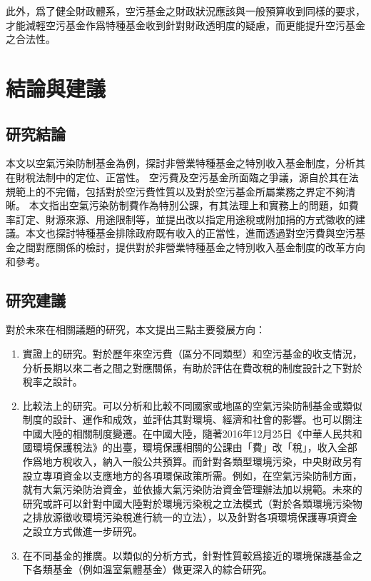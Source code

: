 \documentclass[12pt,a4paper]{article}
\begin{document}
此外，爲了健全財政體系，空污基金之財政狀況應該與一般預算收到同樣的要求，才能減輕空污基金作爲特種基金收到針對財政透明度的疑慮，而更能提升空污基金之合法性。

\section{結論與建議}

\subsection{研究結論}

本文以空氣污染防制基金為例，探討非營業特種基金之特別收入基金制度，分析其在財稅法制中的定位、正當性。
空污費及空污基金所面臨之爭議，源自於其在法規範上的不完備，包括對於空污費性質以及對於空污基金所屬業務之界定不夠清晰。
本文指出空氣污染防制費作為特別公課，有其法理上和實務上的問題，如費率訂定、財源來源、用途限制等，並提出改以指定用途稅或附加捐的方式徵收的建議。本文也探討特種基金排除政府既有收入的正當性，進而透過對空污費與空污基金之間對應關係的檢討，提供對於非營業特種基金之特別收入基金制度的改革方向和參考。



\subsection{研究建議}

對於未來在相關議題的研究，本文提出三點主要發展方向：
\begin{enumerate}
  \item 實證上的研究。對於歷年來空污費（區分不同類型）和空污基金的收支情況，分析長期以來二者之間之對應關係，有助於評估在費改稅的制度設計之下對於稅率之設計。
  \item 比較法上的研究。可以分析和比較不同國家或地區的空氣污染防制基金或類似制度的設計、運作和成效，並評估其對環境、經濟和社會的影響。也可以關注中國大陸的相關制度變遷。在中國大陸，隨著2016年12月25日《中華人民共和國環境保護稅法》的出臺，環境保護相關的公課由「費」改「稅」，收入全部作爲地方稅收入，納入一般公共預算。而針對各類型環境污染，中央財政另有設立專項資金以支應地方的各項環保政策所需。例如，在空氣污染防制方面，就有大氣污染防治資金，並依據大氣污染防治資金管理辦法加以規範。未來的研究或許可以針對中國大陸對於環境污染稅之立法模式（對於各類環境污染物之排放源徵收環境污染稅進行統一的立法），以及針對各項環境保護專項資金之設立方式做進一步研究。
  \item 在不同基金的推廣。以類似的分析方式，針對性質較爲接近的環境保護基金之下各類基金（例如溫室氣體基金）做更深入的綜合研究。
\end{enumerate}
\end{document}
